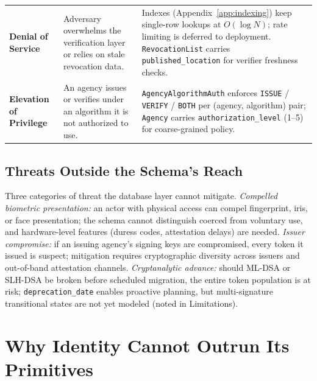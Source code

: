 \documentclass[11pt,letterpaper]{article}
\newcommand{\entity}[1]{\texttt{\color{navydark}#1}}
\begin{document}
\begin{table}[H]
\begin{tabularx}{\textwidth}{>{\bfseries}p{1.35in} >{\RaggedRight\arraybackslash}X >{\RaggedRight\arraybackslash}X}
Denial of Service & Adversary overwhelms the verification layer or relies on stale revocation data. & Indexes (Appendix~\ref{app:indexing}) keep single-row lookups at $O(\log N)$; rate limiting is deferred to deployment. \entity{RevocationList} carries \texttt{published\_location} for verifier freshness checks. \\
Elevation of Privilege & An agency issues or verifies under an algorithm it is not authorized to use. & \entity{AgencyAlgorithmAuth} enforces \texttt{ISSUE} / \texttt{VERIFY} / \texttt{BOTH} per (agency, algorithm) pair; \entity{Agency} carries \texttt{authorization\_level} (1--5) for coarse-grained policy. \\
\bottomrule
\end{tabularx}
\end{table}

\subsection*{Threats Outside the Schema's Reach}

Three categories of threat the database layer cannot mitigate. \textit{Compelled biometric presentation:} an actor with physical access can compel fingerprint, iris, or face presentation; the schema cannot distinguish coerced from voluntary use, and hardware-level features (duress codes, attestation delays) are needed. \textit{Issuer compromise:} if an issuing agency's signing keys are compromised, every token it issued is suspect; mitigation requires cryptographic diversity across issuers and out-of-band attestation channels. \textit{Cryptanalytic advance:} should ML-DSA or SLH-DSA be broken before scheduled migration, the entire token population is at risk; \texttt{deprecation\_date} enables proactive planning, but multi-signature transitional states are not yet modeled (noted in Limitations).

\section{Why Identity Cannot Outrun Its Primitives}
\label{app:substrate}
\end{document}
